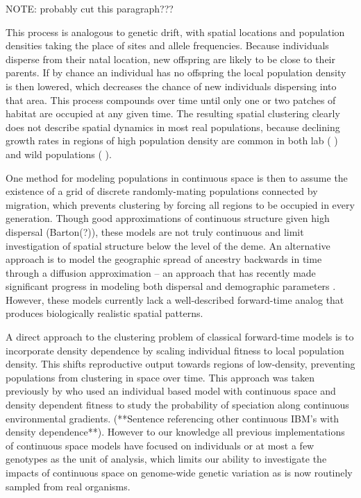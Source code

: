 \documentclass[9pt,twocolumn,twoside]{gsajnl}
\begin{document}
NOTE: probably cut this paragraph???

This process is analogous to genetic drift, with spatial locations and population densities taking the place of sites and allele frequencies. Because individuals disperse from their natal location, new offspring are likely to be close to their parents. If by chance an individual has no offspring the local population density is then lowered, which decreases the chance of new individuals dispersing into that area. This process compounds over time until only one or two patches of habitat are occupied at any given time. The resulting spatial clustering clearly does not describe spatial dynamics in most real populations, because declining growth rates in regions of high population density are common in both lab ( ) and wild populations ( ). 

One method for modeling populations in continuous space is then to assume the existence of a grid of discrete randomly-mating populations connected by migration, which prevents clustering by forcing all regions to be occupied in every generation. Though good approximations of continuous structure given high dispersal (Barton(?)), these models are not truly continuous and limit investigation of spatial structure below the level of the deme. An alternative approach is to model the geographic spread of ancestry backwards in time through a diffusion approximation -- an approach that has recently made significant progress in modeling both dispersal and demographic parameters \citep{Barton2010,Kelleher2014,Ringbauer2017,Ringbauer2018}. However, these models currently lack a well-described forward-time analog that produces biologically realistic spatial patterns. 

A direct approach to the clustering problem of classical forward-time models is to incorporate density dependence by scaling individual fitness to local population density. This shifts reproductive output towards regions of low-density, preventing populations from clustering in space over time. This approach was taken previously by \citep{Doebeli2003} who used an individual based model with continuous space and density dependent fitness to study the probability of speciation along continuous environmental gradients. (**Sentence referencing other continuous IBM's with density dependence**). However to our knowledge all previous implementations of continuous space models have focused on individuals or at most a few genotypes as the unit of analysis, which limits our ability to investigate the impacts of continuous space on genome-wide genetic variation as is now routinely sampled from real organisms. 
\end{document}
